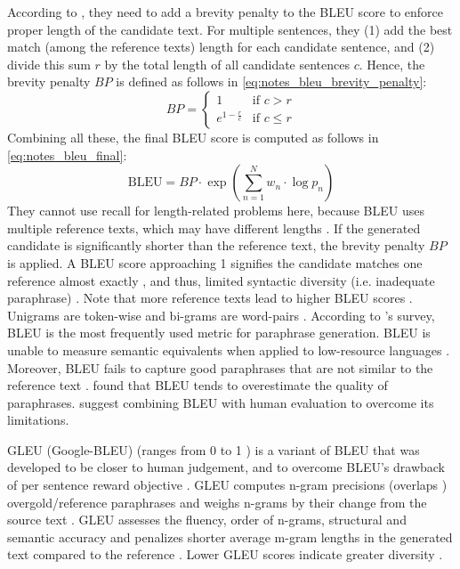 According to \citet{papineni_bleu_2001}, they need to add a brevity penalty to the BLEU score to enforce proper length of the candidate text. 
For multiple sentences, they (1) add the best match (among the reference texts) length for each candidate sentence, and (2) divide this sum $r$ by the total length of all candidate sentences $c$. 
Hence, the brevity penalty $BP$ is defined as follows in \autoref{eq:notes_bleu_brevity_penalty}:
\begin{equation}
    BP = \begin{cases}
        1 & \text{if } c > r \\
        e^{1 - \frac{r}{c}} & \text{if } c \leq r
    \end{cases}
\label{eq:notes_bleu_brevity_penalty}
\end{equation}
Combining all these, the final BLEU score is computed as follows in \autoref{eq:notes_bleu_final}:
\begin{equation}
    \text{BLEU} = BP \cdot \exp\left(\sum_{n=1}^{N} w_n \cdot \log p_n\right)
\label{eq:notes_bleu_final}
\end{equation}
They cannot use recall for length-related problems here, because BLEU uses multiple reference texts, which may have different lengths \cite{papineni_bleu_2001,banerjee_METEOR_2005}.
If the generated candidate is significantly shorter than the reference text, the brevity penalty $BP$ is applied.
A BLEU score approaching 1 signifies the candidate matches one reference almost exactly \cite{papineni_bleu_2001}, 
and thus, limited syntactic diversity (i.e. inadequate paraphrase) \cite{kurt_pehlivanoglu_comparative_2024}.
Note that more reference texts lead to higher BLEU scores \cite{papineni_bleu_2001}.
Unigrams are token-wise and bi-grams are word-pairs \citet{palivela_optimization_2021}.
According to \citet{zhou_paraphrase_2021}'s survey, BLEU is the most frequently used metric for paraphrase generation.
BLEU is unable to measure semantic equivalents \cite{kurt_pehlivanoglu_comparative_2024,zhou_paraphrase_2021} 
when applied to low-resource languages \cite{zhou_paraphrase_2021}.
Moreover, BLEU fails to capture good paraphrases that are not similar to the reference text \cite{zhou_paraphrase_2021}.
\citet{kurt_pehlivanoglu_comparative_2024} found that BLEU tends to overestimate the quality of paraphrases.
\citet{zhou_paraphrase_2021} suggest combining BLEU with human evaluation to overcome its limitations.

GLEU (Google-BLEU) (ranges from 0 to 1 \cite{kurt_pehlivanoglu_comparative_2024}) is a variant of BLEU that was developed to be closer to human judgement, and to 
overcome BLEU's drawback of per sentence reward objective \cite{palivela_optimization_2021}.
GLEU computes n-gram precisions (overlaps \cite{kurt_pehlivanoglu_comparative_2024}) overgold/reference paraphrases 
and weighs n-grams by their change from the source text \cite{palivela_optimization_2021}.
GLEU assesses the fluency, order of n-grams, structural and semantic accuracy 
and penalizes shorter average m-gram lengths in the generated text compared to the reference \cite{kurt_pehlivanoglu_comparative_2024}.
Lower GLEU scores indicate greater diversity \cite{kurt_pehlivanoglu_comparative_2024}.

